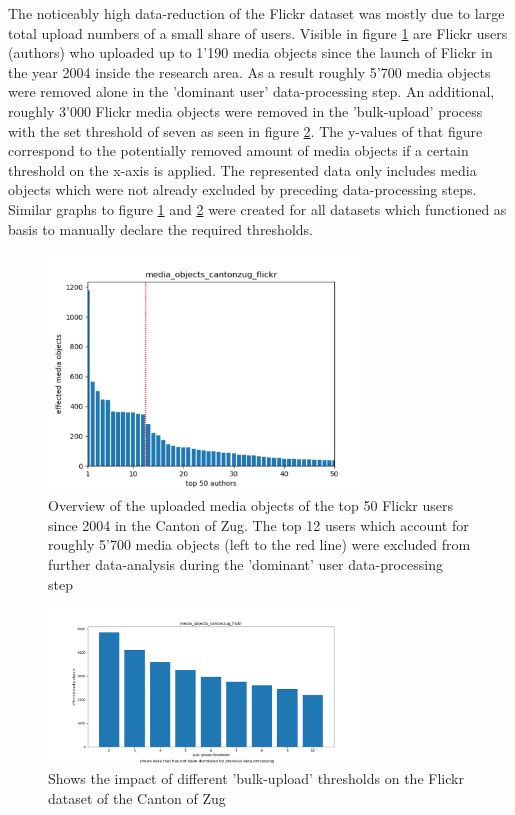 The noticeably high data-reduction of the Flickr dataset was mostly due to large total upload numbers of a small share of users. Visible in figure \ref{img:dominant_users_flickr} are Flickr users (authors) who uploaded up to 1'190 media objects since the launch of Flickr in the year 2004 inside the research area. As a result roughly 5'700 media objects were removed alone in the 'dominant user' data-processing step. An additional, roughly 3'000 Flickr media objects were removed in the 'bulk-upload' process with the set threshold of seven as seen in figure \ref{img:bulk_uploads_flickr}. The y-values of that figure correspond to the potentially removed amount of media objects if a certain threshold on the x-axis is applied. The represented data only includes media objects which were not already excluded by preceding data-processing steps. Similar graphs to figure \ref{img:dominant_users_flickr} and \ref{img:bulk_uploads_flickr} were created for all datasets which functioned as basis to manually declare the required thresholds.

\begin{figure}[!htb]
   \centering
   \includegraphics[width=0.75\textwidth]{img/cantonzug_flickr_top50_w_line}
   \caption{Overview of the uploaded media objects of the top 50 Flickr users since 2004 in the Canton of Zug. The top 12 users which account for roughly 5'700 media objects (left to the red line) were excluded from further data-analysis during the 'dominant' user data-processing step}
   \label{img:dominant_users_flickr}
\end{figure}

\begin{figure}[!htb]
   \centering
   \includegraphics[width=0.75\textwidth]{img/cantonzug_flickr_bulkuploads_cropped.pdf}
   \caption{Shows the impact of different 'bulk-upload' thresholds on the Flickr dataset of the Canton of Zug}
   \label{img:bulk_uploads_flickr}
\end{figure}

